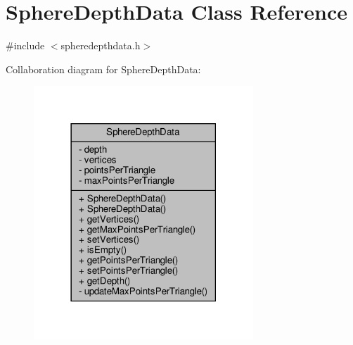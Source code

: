 \hypertarget{class_sphere_depth_data}{}\section{Sphere\+Depth\+Data Class Reference}
\label{class_sphere_depth_data}


{\ttfamily \#include $<$spheredepthdata.\+h$>$}



Collaboration diagram for Sphere\+Depth\+Data\+:\nopagebreak
\begin{figure}[H]
\begin{center}
\leavevmode
\includegraphics[width=234pt]{d1/d7a/class_sphere_depth_data__coll__graph}
\end{center}
\end{figure}
